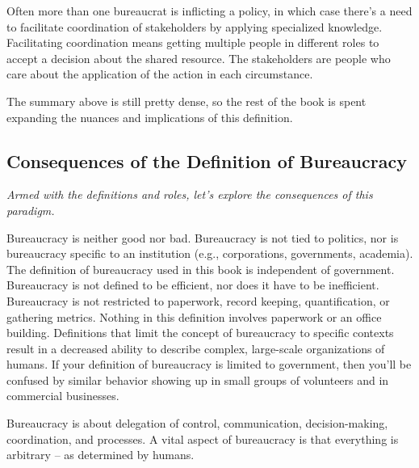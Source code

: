 Often more than one bureaucrat is inflicting a policy, in which case there's a need to facilitate coordination of stakeholders by applying specialized knowledge. 
Facilitating coordination means getting multiple people in different roles
to accept a decision about the shared resource. The stakeholders are people who care about the application of the action in each circumstance.  


The summary above is still pretty dense, so the rest of the book is spent expanding the nuances and implications of this definition.

\subsection*{Consequences of the Definition of Bureaucracy}

\textit{Armed with the definitions and roles, let's explore the consequences of this paradigm.}

Bureaucracy is neither good nor bad. Bureaucracy is not tied to politics, nor is bureaucracy specific to an institution (e.g., corporations, governments, academia). The definition of bureaucracy used in this book is independent of government. Bureaucracy is not defined to be efficient, nor does it have to be inefficient. Bureaucracy is not restricted to paperwork, record keeping, quantification, or gathering metrics. Nothing in this definition involves paperwork or an office building. Definitions that limit the concept of bureaucracy to specific contexts result in a decreased ability to describe complex, large-scale organizations of humans. If your definition of bureaucracy is limited to government, then you'll be confused by similar behavior showing up in small groups of volunteers and in commercial businesses.

Bureaucracy is about delegation of control, communication, decision-making, coordination, and processes. 
A vital aspect of bureaucracy is that everything is arbitrary -- as determined by humans.




